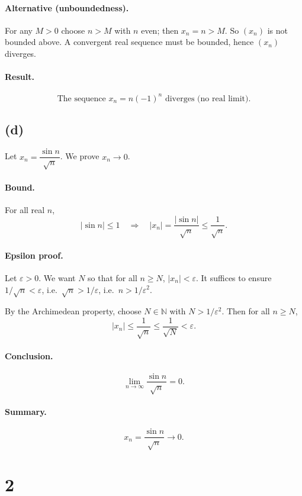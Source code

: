 \documentclass[12pt,a4paper]{article}
\theoremstyle{definition}
\theoremstyle{remark}
\begin{document}
\paragraph{Alternative (unboundedness).}
For any \(M>0\) choose \(n > M\) with \(n\) even; then \(x_n = n > M\).
So \((x_n)\) is not bounded above. A convergent real sequence must be bounded, hence \((x_n)\) diverges.

\paragraph{Result.}
\[
\boxed{\text{The sequence } x_n = n(-1)^n \text{ diverges (no real limit).}}
\]

\subsection*{(d)}
Let \(x_n = \dfrac{\sin n}{\sqrt{n}}\). We prove \(x_n \to 0\).

\paragraph{Bound.}
For all real \(n\),
\[
|\sin n| \le 1 \quad \Longrightarrow\quad |x_n| = \frac{|\sin n|}{\sqrt{n}} \le \frac{1}{\sqrt{n}}.
\]

\paragraph{Epsilon proof.}
Let \(\varepsilon>0\). We want \(N\) so that for all \(n\ge N\), \( |x_n| < \varepsilon\).
It suffices to ensure \(1/\sqrt{n} < \varepsilon\), i.e.\ \(\sqrt{n} > 1/\varepsilon\), i.e.\ \(n > 1/\varepsilon^{2}\).

By the Archimedean property, choose \(N\in\mathbb{N}\) with \(N > 1/\varepsilon^{2}\).
Then for all \(n\ge N\),
\[
|x_n| \le \frac{1}{\sqrt{n}} \le \frac{1}{\sqrt{N}} < \varepsilon.
\]

\paragraph{Conclusion.}
\[
\lim_{n\to\infty} \frac{\sin n}{\sqrt{n}} = 0.
\]

\paragraph{Summary.}
\[
\boxed{x_n = \frac{\sin n}{\sqrt{n}} \longrightarrow 0.}
\]

\section*{2}
\end{document}
